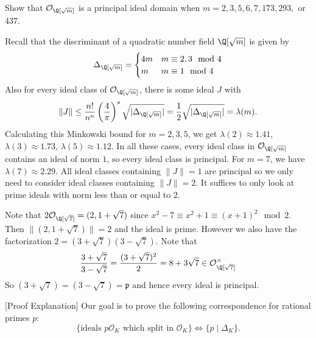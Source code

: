 \documentclass[11pt,letterpaper]{article}
\begin{document}
\begin{cproblem}{5.6}
    Show that $\mathcal{O}_{\Q[\sqrt{m}]}$ is a principal ideal domain when $m=2,3,5,6,7,173,293,$ or $437$.
\end{cproblem}

\begin{solution}
    Recall that the discriminant of a quadratic number field $\Q[\sqrt{m}]$ is given by
    \[
        \Delta_{\Q[\sqrt{m}]}=\begin{cases}
            4m&m\equiv 2,3\mod 4\\
            m&m\equiv 1\mod 4
        \end{cases}
    \] 
    Also for every ideal class of $\mathcal{O}_{\Q[\sqrt{m}]}$, there is some ideal $J$ with
    \[
        \|J\| \leq \frac{n!}{n^n}\left(\frac{4}{\pi}\right)^s\sqrt{|\Delta_{\Q[\sqrt{m}]}|}=\frac{1}{2}\sqrt{|\Delta_{\Q[\sqrt{m}]}|}=\lambda(m)
    .\] 
    Calculating this Minkowski bound for $m=2,3,5$, we get $\lambda(2)\approx 1.41$, $\lambda(3)\approx 1.73$, $\lambda(5)\approx 1.12$. In all these cases, every ideal class in $\mathcal{O}_{\Q[\sqrt{m}]}$ contains an ideal of norm $1$, so every ideal class is principal. For $m=7$, we have $\lambda(7)\approx 2.29$. All ideal classes containing $\|J\|=1$ are principal so we only need to consider ideal classes containing $\|J\|=2$. It suffices to only look at prime ideals with norm less than or equal to $2$. 

    Note that $2\mathcal{O}_{\Q[\sqrt{7}]}=(2,1+\sqrt{7})$ since $x^2-7\equiv x^2+1\equiv (x+1)^2\mod 2$. Then $\|(2,1+\sqrt{7})\|=2$ and the ideal is prime. However we also have the factorization $2=(3+\sqrt{7})(3-\sqrt{7})$. Note that
    \[
        \frac{3+\sqrt{7}}{3-\sqrt{7}} = \frac{(3+\sqrt{7})^2}{2} = 8+3\sqrt{7}\in \mathcal{O}_{\Q[\sqrt{7}]}^\times
    \]
    So $(3+\sqrt{7})=(3-\sqrt{7})=\mathfrak{p}$ and hence every ideal is principal.
\end{solution}

\begin{cproblem}{}[Proof Explanation]
    Our goal is to prove the following correspondence for rational primes $p$:
    \[
        \{\textrm{ideals }p\mathcal{O}_K\textrm{ which split in }\mathcal{O}_K\} \Longleftrightarrow \{p \mid \Delta_K\}
    .\] 
\end{cproblem}
\end{document}
